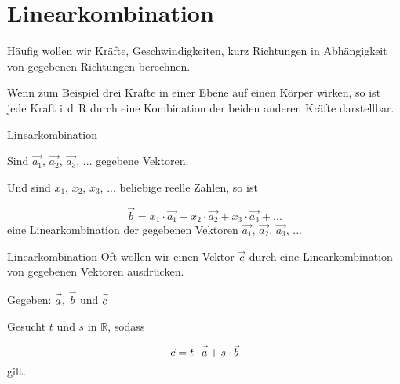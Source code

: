 \section{Linearkombination}


Häufig wollen wir Kräfte, Geschwindigkeiten, kurz Richtungen in
Abhängigkeit von gegebenen Richtungen berechnen.

Wenn zum Beispiel drei Kräfte in einer Ebene auf einen Körper wirken, so ist jede
Kraft i.\,d.\,R durch eine Kombination der beiden anderen Kräfte
darstellbar.

\begin{definition}{Linearkombination}{}

 
  Sind $\vec{a_1}$, $\vec{a_2}$, $\vec{a_3}$, ... gegebene Vektoren.

  Und sind $x_1$, $x_2$, $x_3$, ... beliebige reelle Zahlen, so ist

  $$\vec{b} = x_1\cdot{}\vec{a_1} +  x_2\cdot{}\vec{a_2} +
  x_3\cdot{}\vec{a_3} + ...$$
  eine Linearkombination der gegebenen Vektoren $\vec{a_1}$, $\vec{a_2}$, $\vec{a_3}$, ... 
\end{definition}




\begin{beispiel}{Linearkombination}{}
Oft wollen wir einen Vektor $\vec{c}$ durch eine Linearkombination von
gegebenen Vektoren ausdrücken.

Gegeben: $\vec{a\vphantom{b}}$, $\vec{b}$ und $\vec{c\vphantom{b}}$

Gesucht $t$ und $s$ in $\mathbb{R}$, sodass

$$\vec{c} = t\cdot{}\vec{a\vphantom{b}} + s\cdot{}\vec{b}$$
gilt.

\end{beispiel}

\newpage

